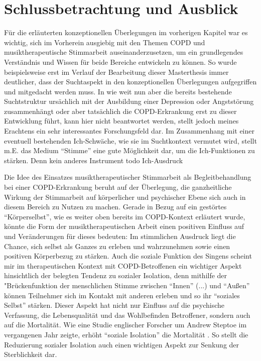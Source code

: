 \chapter{Schlussbetrachtung und Ausblick} %
Für die erläuterten konzeptionellen Überlegungen im vorherigen Kapitel war es wichtig, sich im Vorherein ausgiebig mit den Themen COPD und musiktherapeutische Stimmarbeit auseinanderzusetzen, um ein grundlegendes Verständnis und Wissen für beide Bereiche entwickeln zu können. So wurde beispielsweise erst im Verlauf der Bearbeitung dieser Masterthesis immer deutlicher, dass der Suchtaspekt in den konzeptionellen Überlegungen aufgegriffen und mitgedacht werden muss. In wie weit nun aber die bereits bestehende Suchtstruktur ursächlich mit der Ausbildung einer Depression oder Angststörung zusammenhängt oder aber tatsächlich die COPD-Erkrankung erst zu dieser Entwicklung führt, kann hier nicht beantwortet werden, stellt jedoch meines Erachtens ein sehr interessantes Forschungsfeld dar. Im Zusammenhang mit einer eventuell bestehenden Ich-Schwäche, wie sie im Suchtkontext vermutet wird, stellt m.E. das Medium "`Stimme"' eine gute Möglichkeit dar, um die Ich-Funktionen zu stärken. Denn kein anderes Instrument todo Ich-Ausdruck

Die Idee des Einsatzes musiktherapeutischer Stimmarbeit als Begleitbehandlung bei einer COPD-Erkrankung beruht auf der Überlegung, die ganzheitliche Wirkung der Stimmarbeit auf körperlicher und psychischer Ebene sich auch in diesem Bereich zu Nutzen zu machen. Gerade in Bezug auf ein gestörtes "`Körperselbst"', wie es weiter oben bereits im COPD-Kontext erläutert wurde, könnte die Form der musiktherapeutischen Arbeit einen positiven Einfluss auf und Veränderungen für dieses bedeuten: Im stimmlichen Ausdruck liegt die Chance, sich selbst als Ganzes zu erleben und wahrzunehmen sowie einen positiven Körperbezug zu stärken. Auch die soziale Funktion des Singens scheint mir im therapeutischen Kontext mit COPD-Betroffenen ein wichtiger Aspekt hinsichtlich der belegten Tendenz zu sozialer Isolation, denn mithilfe der "Brückenfunktion der menschlichen Stimme zwischen "`Innen"' (...) und "`Außen"' können Teilnehmer sich im Kontakt mit anderen erleben und so ihr "`soziales Selbst"' stärken. Dieser Aspekt hat nicht nur Einfluss auf die psychische Verfassung, die Lebensqualität und das Wohlbefinden Betroffener, sondern auch auf die Mortalität. Wie eine Studie englischer Forscher um Andrew Steptoe im vergangenen Jahr zeigte, erhöht "`soziale Isolation"' die Mortalität \autocite[vgl.][]{pmid23530191}. So stellt die Reduzierung sozialer Isolation auch einen wichtigen Aspekt zur Senkung der Sterblichkeit dar.


